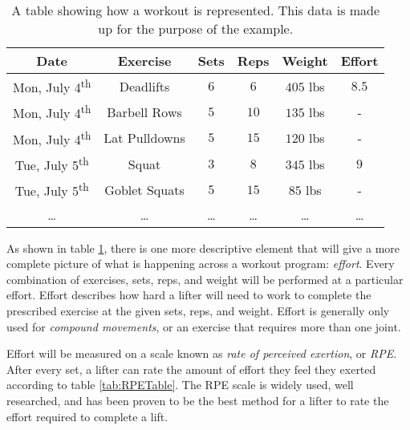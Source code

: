 \begin{table}[h]
    \centering
    \begin{tabular}{c|c|c|c|c|c}
        Date & Exercise & Sets & Reps & Weight & Effort \\
        \hline
        Mon, July 4\textsuperscript{th} & Deadlifts & $6$ & $6$ & $405$ lbs & $8.5$ \\
        Mon, July 4\textsuperscript{th} & Barbell Rows & $5$ & $10$ & $135$ lbs & - \\
        Mon, July 4\textsuperscript{th} & Lat Pulldowns & $5$ & $15$ & $120$ lbs & - \\
        Tue, July 5\textsuperscript{th} & Squat & $3$ & $8$ & $345$ lbs & $9$ \\
        Tue, July 5\textsuperscript{th} & Goblet Squats & $5$ & $15$ & $85$ lbs & - \\
        \dots & \dots & \dots & \dots & \dots & \dots \\
    \end{tabular}
    \caption{A table showing how a workout is represented. This data is made up for the purpose of the example.}
    \label{tab:WorkoutProgramExample}
\end{table}

As shown in table \ref{tab:WorkoutProgramExample}, there is one more descriptive element that will give a more complete picture of what is happening across a workout program: \textit{effort}. Every combination of exercises, sets, reps, and weight will be performed at a particular effort. Effort describes how hard a lifter will need to work to complete the prescribed exercise at the given sets, reps, and weight. Effort is generally only used for \textit{compound movements}, or an exercise that requires more than one joint.

Effort will be measured on a scale known as \textit{rate of perceived exertion}, or \textit{RPE}. After every set, a lifter can rate the amount of effort they feel they exerted according to table \ref{tab:RPETable}. The RPE scale is widely used, well researched, and has been proven to be the best method for a lifter to rate the effort required to complete a lift. \cite{RPE_ACCURACY}

